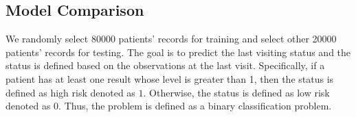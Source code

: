 \documentclass{article}
\begin{document}

\subsection{Model Comparison}
We randomly select 80000 patients' records for training and select other 20000 patients' records for testing. The goal is to predict the last visiting status and the status is defined based on the observations at the last visit. Specifically, if a patient has at least one result whose level is greater than 1, then the status is defined as high risk denoted as $1$. Otherwise, the status is defined as low risk denoted as $0$. Thus, the problem is defined as a binary classification problem. 
\end{document}
